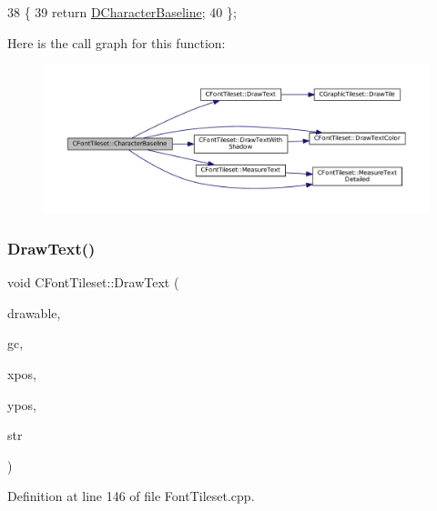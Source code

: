 \begin{DoxyCode}
38                                       \{
39             \textcolor{keywordflow}{return} \hyperlink{classCFontTileset_aba19d07744c08aeb957728067c52466c}{DCharacterBaseline};  
40         \};
\end{DoxyCode}
Here is the call graph for this function\+:\nopagebreak
\begin{figure}[H]
\begin{center}
\leavevmode
\includegraphics[width=350pt]{classCFontTileset_a888dd4fe8f46b35550386a1997f4376a_cgraph}
\end{center}
\end{figure}
\hypertarget{classCFontTileset_a4121603694e96e93378e079edd27086e}{}\label{classCFontTileset_a4121603694e96e93378e079edd27086e} 
\subsubsection{\texorpdfstring{Draw\+Text()}{DrawText()}}
{\footnotesize\ttfamily void C\+Font\+Tileset\+::\+Draw\+Text (\begin{DoxyParamCaption}\item[{Gdk\+Drawable $\ast$}]{drawable,  }\item[{Gdk\+GC $\ast$}]{gc,  }\item[{gint}]{xpos,  }\item[{gint}]{ypos,  }\item[{const std\+::string \&}]{str }\end{DoxyParamCaption})}



Definition at line 146 of file Font\+Tileset.\+cpp.


